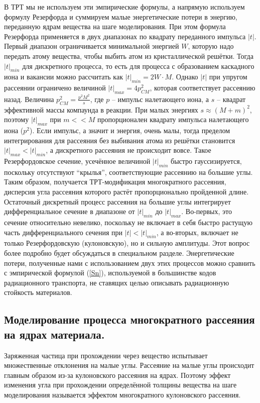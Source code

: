 \documentclass[a4paper,12pt]{article}
\begin{document}
\begin{large}
  В ТРТ мы не используем эти эмпирические формулы, а напрямую используем формулу Резерфорда и суммируем малые энергетические потери в энергию, переданную ядрам вещества на шаге моделирования.
  При этом формула Резерфорда применяется в двух диапазонах по квадрату переданного импульса $|t|$.
  Первый диапазон ограничивается минимальной энергией $W$, которую надо передать атому вещества, чтобы выбить атом из кристаллической решётки.
  Тогда $|t|_{min}$ для дискретного процесса, то есть для процесса с образованием каскадного иона и вакансии можно рассчитать как $|t|_{min}=2W\cdot M$.
  Однако $|t|$ при упругом рассеянии ограничено величиной $|t|_{max}=4p_{CM}^2$, которая соответствует рассеянию назад.
  Величина $p_{CM}^2=\frac{p^2M^2}{s}$, где $p$ -- импульс налетающего иона, а $s$ -- квадрат эффективной массы компаунда в реакции.
  При малых энергиях $s\approx (M+m)^2$, поэтому $|t|_{max}$ при $m<<M$ пропорционален квадрату импульса налетающего иона ($p^2$).
  Если импульс, а значит и энергия, очень малы, тогда пределом интегрирования для рассеяния без выбивания атома из решётки становится $|t|_{max}< |t|_{min}$, а дискретного рассеяния не происходит вовсе.
  Такое Резерфордовское сечение, усечённое величиной $|t|_{min}$ быстро гауссизируется, поскольку отсутствуют ``крылья'', соответствующие рассеянию на большие углы.
  Таким образом, получается ТРТ-модификация многократного рассеяния, дисперсия угла рассеяния которого растёт пропорционально пройденной длине.
  Остаточный дискретный процесс рассеяния на большие углы интегрирует дифференциальное сечение в диапазоне от $|t|_{min}$ до $|t|_{max}$.
  Во-первых, это сечение относительно невелико, поскольку не включает в себя быстро растущую часть дифференциального сечения при $|t| < |t|_{min}$, а во-вторых, включает не только Резерфордовскую (кулоновскую), но и сильную амплитуды.
  Этот вопрос более подробно будет обсуждаться в специальном разделе.
  Энергетические потери, полученные нами с использованием двух этих процессов можно сравнить с эмпирической формулой (\ref{Sn}), используемой в большинстве кодов радиационного транспорта, не ставящих целью описывать радиационную стойкость материалов.

  \subsection{Моделирование процесса многократного рассеяния на ядрах материала.}
  \label{MultipleScattering}

  Заряженная частица при прохождении через вещество испытывает множественные отклонения на малые углы.
  Рассеяние на малые углы происходит главным образом из-за кулоновского рассеяния на ядрах.
  Поэтому эффект изменения угла при прохождении определённой толщины вещества на шаге моделирования называется эффектом многократного кулоновского рассеяния.


\end{large}
\end{document}
